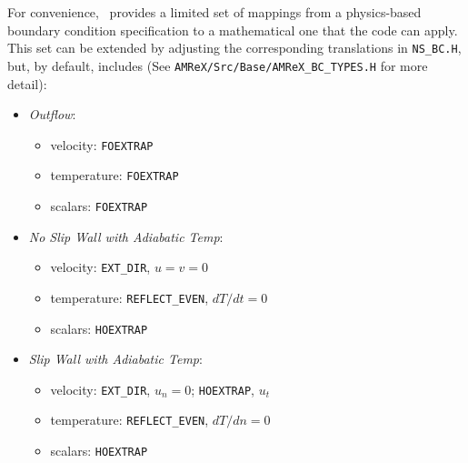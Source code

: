 For convenience, \iamr\ provides a limited set of mappings from a physics-based boundary condition
specification to a mathematical one that the code can apply.  This set can be extended
by adjusting the corresponding translations in {\tt NS\_BC.H}, but, by default, includes 
(See {\tt AMReX/Src/Base/AMReX\_BC\_TYPES.H} for more detail):
\begin{itemize}
\item {\it Outflow}:
  \begin{itemize}
    \item velocity: {\tt FOEXTRAP}
    \item temperature: {\tt FOEXTRAP}
    \item scalars: {\tt FOEXTRAP}
  \end{itemize}
  
\item {\it No Slip Wall with Adiabatic Temp}:
  \begin{itemize}
  \item velocity: {\tt EXT\_DIR}, $u=v=0$
  \item temperature: {\tt REFLECT\_EVEN}, $dT/dt=0$
  \item scalars: {\tt HOEXTRAP}
  \end{itemize}

    
\item {\it Slip Wall with Adiabatic Temp}:
  \begin{itemize}
  \item velocity: {\tt EXT\_DIR}, $u_n=0$; {\tt HOEXTRAP}, $u_t$
  \item temperature: {\tt REFLECT\_EVEN}, $dT/dn=0$
  \item scalars: {\tt HOEXTRAP}
  \end{itemize}
  

\end{itemize}


